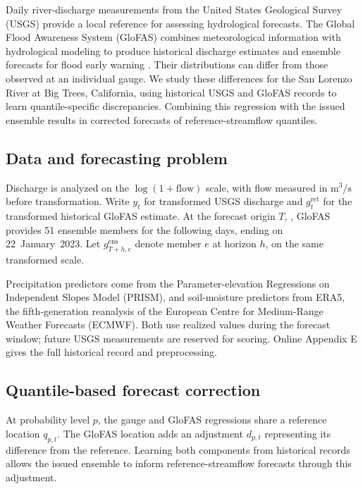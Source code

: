 \documentclass[12pt,letterpaper]{article}
\numberwithin{equation}{section}
\begin{document}
Daily river-discharge measurements from the United States Geological Survey
(USGS) provide a local reference for assessing hydrological forecasts.
The Global Flood Awareness System (GloFAS) combines meteorological
information with hydrological modeling to produce historical discharge
estimates and ensemble forecasts for flood early warning
\citep{AlfieriEtAl2013GloFAS,HarriganEtAl2023GloFASForecasts,
CEMS2026GloFASDocumentation}. Their distributions can differ from those
observed at an individual gauge. We study these differences for the San
Lorenzo River at Big Trees, California, using historical USGS and GloFAS
records to learn quantile-specific discrepancies. Combining this regression
with the issued ensemble results in corrected forecasts of reference-streamflow
quantiles.

\subsection{Data and forecasting problem}

Discharge is analyzed on the \(\log(1+\mathrm{flow})\) scale, with flow
measured in \(\mathrm{m}^3/\mathrm{s}\) before transformation. Write
\(y_t\) for transformed USGS discharge and \(g_t^{\mathrm{ret}}\) for the
transformed historical GloFAS estimate. At the forecast origin \(T\),
\GlofasApplicationCurrentOriginDate{}, GloFAS provides 51 ensemble
members for the following \GlofasApplicationCurrentScoredHorizons{} days,
ending on 22~January~2023. Let \(g_{T+h,e}^{\mathrm{ens}}\) denote member
\(e\) at horizon \(h\), on the same transformed scale.

Precipitation predictors come from the Parameter-elevation Regressions on
Independent Slopes Model (PRISM), and soil-moisture predictors from ERA5,
the fifth-generation reanalysis of the European Centre for Medium-Range
Weather Forecasts (ECMWF). Both use realized values during the forecast
window; future USGS measurements are reserved for scoring. Online Appendix E
gives the full historical record and preprocessing.

\subsection{Quantile-based forecast correction}

At probability level \(p\), the gauge and GloFAS regressions share a
reference location \(q_{p,t}\). The GloFAS location adds an adjustment
\(d_{p,t}\) representing its difference from the reference. Learning both
components from historical records allows the issued ensemble to inform
reference-streamflow forecasts through this adjustment.
\end{document}
